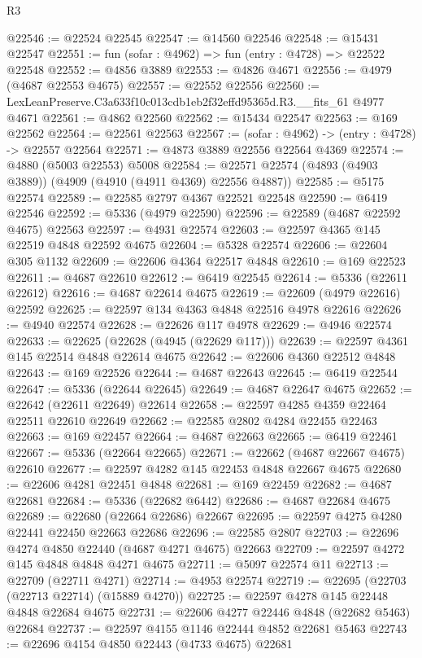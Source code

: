 \begin{lexlean}{R3}
\begin{coremodule}
@22546 := @22524 @22545
@22547 := @14560 @22546
@22548 := @15431 @22547
@22551 := fun (sofar : @4962) => fun (entry : @4728) => @22522 @22548
@22552 := @4856 @3889
@22553 := @4826 @4671
@22556 := @4979 (@4687 @22553 @4675)
@22557 := @22552 @22556
@22560 := LexLeanPreserve.C3a633f10c013cdb1eb2f32effd95365d.R3.__fits_61 @4977 @4671
@22561 := @4862 @22560
@22562 := @15434 @22547
@22563 := @169 @22562
@22564 := @22561 @22563
@22567 := (sofar : @4962) -> (entry : @4728) -> @22557 @22564
@22571 := @4873 @3889 @22556 @22564 @4369
@22574 := @4880 (@5003 @22553) @5008
@22584 := @22571 @22574 (@4893 (@4903 @3889)) (@4909 (@4910 (@4911 @4369) @22556 @4887))
@22585 := @5175 @22574
@22589 := @22585 @2797 @4367 @22521 @22548
@22590 := @6419 @22546
@22592 := @5336 (@4979 @22590)
@22596 := @22589 (@4687 @22592 @4675) @22563
@22597 := @4931 @22574
@22603 := @22597 @4365 @145 @22519 @4848 @22592 @4675
@22604 := @5328 @22574
@22606 := @22604 @305 @1132
@22609 := @22606 @4364 @22517 @4848
@22610 := @169 @22523
@22611 := @4687 @22610
@22612 := @6419 @22545
@22614 := @5336 (@22611 @22612)
@22616 := @4687 @22614 @4675
@22619 := @22609 (@4979 @22616) @22592
@22625 := @22597 @134 @4363 @4848 @22516 @4978 @22616
@22626 := @4940 @22574
@22628 := @22626 @117 @4978
@22629 := @4946 @22574
@22633 := @22625 (@22628 (@4945 (@22629 @117)))
@22639 := @22597 @4361 @145 @22514 @4848 @22614 @4675
@22642 := @22606 @4360 @22512 @4848
@22643 := @169 @22526
@22644 := @4687 @22643
@22645 := @6419 @22544
@22647 := @5336 (@22644 @22645)
@22649 := @4687 @22647 @4675
@22652 := @22642 (@22611 @22649) @22614
@22658 := @22597 @4285 @4359 @22464 @22511 @22610 @22649
@22662 := @22585 @2802 @4284 @22455 @22463
@22663 := @169 @22457
@22664 := @4687 @22663
@22665 := @6419 @22461
@22667 := @5336 (@22664 @22665)
@22671 := @22662 (@4687 @22667 @4675) @22610
@22677 := @22597 @4282 @145 @22453 @4848 @22667 @4675
@22680 := @22606 @4281 @22451 @4848
@22681 := @169 @22459
@22682 := @4687 @22681
@22684 := @5336 (@22682 @6442)
@22686 := @4687 @22684 @4675
@22689 := @22680 (@22664 @22686) @22667
@22695 := @22597 @4275 @4280 @22441 @22450 @22663 @22686
@22696 := @22585 @2807
@22703 := @22696 @4274 @4850 @22440 (@4687 @4271 @4675) @22663
@22709 := @22597 @4272 @145 @4848 @4848 @4271 @4675
@22711 := @5097 @22574 @11
@22713 := @22709 (@22711 @4271)
@22714 := @4953 @22574
@22719 := @22695 (@22703 (@22713 @22714) (@15889 @4270))
@22725 := @22597 @4278 @145 @22448 @4848 @22684 @4675
@22731 := @22606 @4277 @22446 @4848 (@22682 @5463) @22684
@22737 := @22597 @4155 @1146 @22444 @4852 @22681 @5463
@22743 := @22696 @4154 @4850 @22443 (@4733 @4675) @22681

\end{coremodule}
\end{lexlean}
